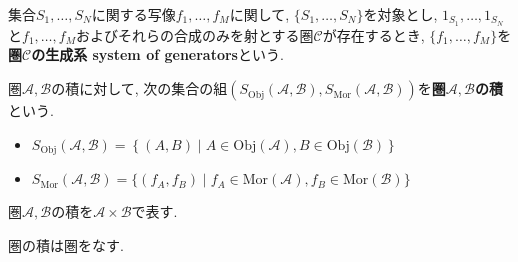 \begin{comment}
\begin{proof}
\end{proof}
\end{comment}
\begin{Def}
集合$S_1,\dots,S_N$に関する写像$f_1,\dots,f_M$に関して,
$\{S_1,\dots,S_N\}$を対象とし,
$1_{S_1},\dots,1_{S_N}$と$f_1,\dots,f_M$およびそれらの合成のみを射とする圏$\mathscr{C}$が存在するとき, $\{f_1,\dots,f_M\}$を{\bf 圏$\mathscr{C}$の生成系 system of generators}という.
\end{Def}
\begin{Def}
圏$\mathscr{A},\mathscr{B}$の積に対して, 次の集合の組$(S_{\mathrm{Obj}}\left(\mathscr{A},\mathscr{B}\right),S_{\mathrm{Mor}}\left(\mathscr{A},\mathscr{B}\right))$を{\bf 圏$\mathscr{A},\mathscr{B}$の積}という.
\begin{itemize}
\item $S_{\mathrm{Obj}}\left(\mathscr{A},\mathscr{B}\right)
=\left\{(A,B)\mid A\in\mathrm{Obj}(\mathscr{A}),B\in\mathrm{Obj}(\mathscr{B})\right\}$
\item $S_{\mathrm{Mor}}\left(\mathscr{A},\mathscr{B}\right)
=\{(f_A,f_B)\mid f_A\in\mathrm{Mor(\mathscr{A})},
f_B\in\mathrm{Mor(\mathscr{B})}\}$
\end{itemize}
\end{Def}
\begin{Def}
圏$\mathscr{A},\mathscr{B}$の積を$\mathscr{A}\times\mathscr{B}$で表す.
\end{Def}
\begin{Prop}
圏の積は圏をなす.
\end{Prop}

